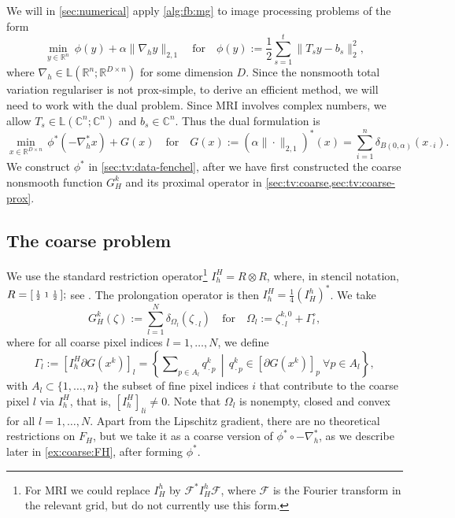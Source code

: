 \documentclass[a4paper,english]{jnsao}
\theoremstyle{definition}
\numberwithin{algorithm}{section}
\newcommand{\df}[2]{#1 ( #2 )}
\newcommand{\nr}[2]{ \| #1 \|_{#2}}
\def\grad{\nabla}
\def\linear{\mathbb{L}}
\def\defeq{:=}
\def\R{\mathbb{R}}
\def\C{\mathbb{C}}
\newcommand{\freevar}{\,\boldsymbol\cdot\,}
\def\polar#1{#1^\circ}
\begin{document}
We will in \cref{sec:numerical} apply \cref{alg:fb:mg} to image processing problems of the form
\begin{equation}
    \label{eq:tv:primal-problem}
    \min _{y\in \R^n}~ \phi(y) + \alpha \nr{\nabla_h y}{2,1}
    \quad\text{for}\quad
    \df{\phi}{y} := \frac{1}{2}\sum _{s=1}^t \nr{T_sy-b_s}{2}^2,
\end{equation}
where $\grad_h \in \linear(\R^n; \R^{D \times n})$ for some dimension $D$.
Since the nonsmooth total variation regulariser is not prox-simple, to derive an efficient method, we will need to work with the dual problem.
Since MRI involves complex numbers, we allow $T_s \in \linear(\C^n; \C^n)$ and $b_s \in \C^n$.
Thus the dual formulation is
\begin{equation}
    \label{eq:tv:dual-problem}
    \min _{x\in \R^{D\times n}}\, \phi ^*(-\nabla_h ^* x) + G(x)
    \quad\text{for}\quad
    \df{G}{x} \defeq (\alpha\nr{\cdot}{2,1})^*(x) = \sum_{i=1}^n \delta _{B(0,\alpha)}(x_{\freevar i}).
\end{equation}
We construct $\phi^*$ in \cref{sec:tv:data-fenchel}, after we have first constructed the coarse nonsmooth function $G_H^k$ and its proximal operator in \cref{sec:tv:coarse,sec:tv:coarse-prox}.

\subsection{The coarse problem}
\label{sec:tv:coarse}

We use the standard restriction operator\footnote{For MRI we could replace $I_H^h$ by $\mathcal{F}^*I_H^h\mathcal{F}$, where $\mathcal{F}$ is the Fourier transform in the relevant grid, but do not currently use this form.} $I_h^H = R  \otimes R$, where, in stencil notation,
$R = \begin{bsmallmatrix}
        \frac{1}{2}& 1 & \frac{1}{2}
       \end{bsmallmatrix};$
see \cite{briggs2000multigrid}.
The prolongation operator is then $I_h^H = \frac{1}{4} (I_H^h)^*$.
We take
\begin{equation}
    \label{eq:tv:gHk}
    G_H^k(\zeta) \defeq \sum_{l=1}^N \delta_{\Omega_l}(\zeta_{\freevar l})
    \quad\text{for}\quad
    \Omega_l \defeq \zeta_{\freevar l}^{k,0} + \polar \Gamma_l,
\end{equation}
where for all coarse pixel indices $l=1,\ldots,N$, we define
\begin{equation}
    \label{eq:tv:gammal}
    \Gamma_l
    \defeq
    [I_h^H \partial G(x^k)]_l
    =
    \left\{
        \sum\nolimits_{p\in A_l}q^k_{\freevar p}
        \,\middle|\,
        q_{\freevar p}^k \in [\partial G(x^k)]_p\ \forall p\in A_l
    \right\},
\end{equation}
with $A_l \subset \{1,\ldots,n\}$ the subset of fine pixel indices $i$ that contribute to the coarse pixel $l$ via $I_h^H$, that is, $[I_h^H]_{li} \ne 0$.
Note that $\Omega_l$ is nonempty, closed and convex for all $l=1,\ldots,N$.
Apart from the Lipschitz gradient, there are no theoretical restrictions on $F_H$, but we
take it as a coarse version of $\phi ^*\circ -\nabla _h^*$, as we describe later in \cref{ex:coarse:FH}, after forming $\phi^*$.
\end{document}
